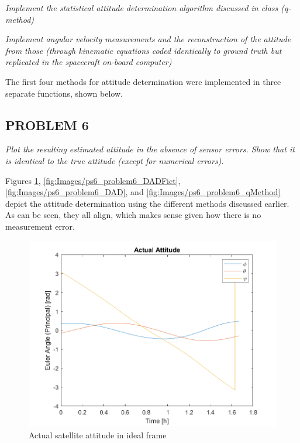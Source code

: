 \textit{Implement the statistical attitude determination algorithm discussed in class (q-method)}

\textit{Implement angular velocity measurements and the reconstruction of the attitude from those (through kinematic equations coded identically to ground truth but replicated in the spacecraft on-board computer)}

The first four methods for attitude determination were implemented in three separate functions, shown below.







\subsection{PROBLEM 6}
\textit{Plot the resulting estimated attitude in the absence of sensor errors. Show that it is identical to the true attitude (except for numerical errors).}

Figures \ref{fig:Images/ps6_problem6_actual}, \ref{fig:Images/ps6_problem6_DADFict}, \ref{fig:Images/ps6_problem6_DAD}, and \ref{fig:Images/ps6_problem6_qMethod} depict the attitude determination using the different methods discussed earlier. As can be seen, they all align, which makes sense given how there is no measurement error.

\begin{figure}[H]
\centering
\includegraphics[scale=0.7]{Images/ps6_problem6_actual.png}
\caption{Actual satellite attitude in ideal frame}
\label{fig:Images/ps6_problem6_actual}
\end{figure}

